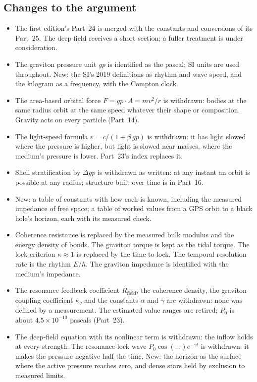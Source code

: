 \documentclass[11pt,a4paper]{article}
\begin{document}
\subsection*{Changes to the argument}
\begin{itemize}
\item The first edition's Part~24 is merged with the constants and conversions of its Part~25. The deep field receives a short section; a fuller treatment is under consideration.
\item The graviton pressure unit \emph{gp} is identified as the pascal; SI units are used throughout. New: the SI's 2019 definitions as rhythm and wave speed, and the kilogram as a frequency, with the Compton clock.
\item The area-based orbital force $F = gp\cdot A = mv^2/r$ is withdrawn: bodies at the same radius orbit at the same speed whatever their shape or composition. Gravity acts on every particle (Part~14).
\item The light-speed formula $v = c/(1+\beta\, gp)$ is withdrawn: it has light slowed where the pressure is higher, but light is slowed near masses, where the medium's pressure is lower. Part~23's index replaces it.
\item Shell stratification by $\Delta gp$ is withdrawn as written: at any instant an orbit is possible at any radius; structure built over time is in Part~16.
\item New: a table of constants with how each is known, including the measured impedance of free space; a table of worked values from a GPS orbit to a black hole's horizon, each with its measured check.
\item Coherence resistance is replaced by the measured bulk modulus and the energy density of bonds. The graviton torque is kept as the tidal torque. The lock criterion $\kappa\approx1$ is replaced by the time to lock. The temporal resolution rate is the rhythm $E/h$. The graviton impedance is identified with the medium's impedance.
\item The resonance feedback coefficient $R_{\text{field}}$, the coherence density, the graviton coupling coefficient $\kappa_g$ and the constants $\alpha$ and $\gamma$ are withdrawn: none was defined by a measurement. The estimated value ranges are retired; $P_0$ is about $4.5\times10^{-10}$ pascals (Part~23).
\item The deep-field equation with its nonlinear term is withdrawn: the inflow holds at every strength. The resonance-lock wave $P_0\cos(\ldots)e^{-\gamma t}$ is withdrawn: it makes the pressure negative half the time. New: the horizon as the surface where the active pressure reaches zero, and dense stars held by exclusion to measured limits.

\end{itemize}
\end{document}
